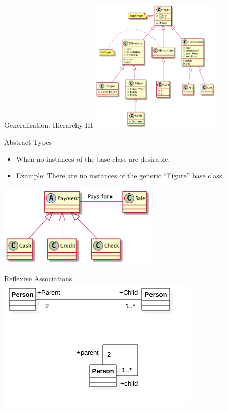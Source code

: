 \documentclass[10pt,t,a4paper]{beamer}
\begin{document}
\begin{frame}[label=sec-1-16]{Generalisation: Hierarchy III}
\includegraphics[height=6.5cm]{FInheritance3.png}
\end{frame}
\begin{frame}[label=sec-1-17]{Abstract Types}
\begin{itemize}
\item When no instances of the base class are desirable.
\item Example: There are no instances of the generic ``Figure'' base class.
\end{itemize}
\includegraphics[height=4cm]{FInheritanceAbstract.png}
\end{frame}
\begin{frame}[label=sec-1-18]{Reflexive Associations}
\includegraphics[width=.9\linewidth]{./IReflexive.png}
\end{frame}
\end{document}
